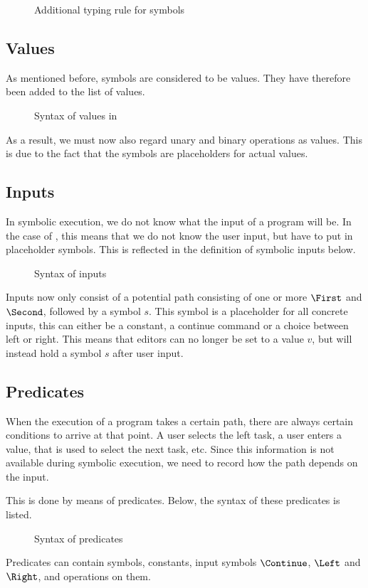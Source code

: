 \begin{figure}
\caption{Additional typing rule for symbols}
  \label{fig:typingsymbol}
\end{figure}

\subsection{Values}

As mentioned before, symbols are considered to be values.
They have therefore been added to the list of values.

\begin{figure}
\caption{Syntax of values in \TOPHAT}
  \label{fig:syntaxvalues}
\end{figure}

As a result, we must now also regard unary and binary operations as values.
This is due to the fact that the symbols are placeholders for actual values.


\subsection{Inputs}

In symbolic execution, we do not know what the input of a program will be.
In the case of \TOPHAT, this means that we do not know the user input, but have to put in placeholder symbols.
This is reflected in the definition of symbolic inputs below.

\begin{figure}
\caption{Syntax of inputs}
  \label{fig:syntaxinputs}
\end{figure}

Inputs now only consist of a potential path consisting of one or more $\First$ and $\Second$,
followed by a symbol $s$.
This symbol is a placeholder for all concrete inputs, this can either be a constant, a continue command or a choice between left or right.
This means that editors can no longer be set to a value $v$, but will instead hold a symbol $s$ after user input.


\subsection{Predicates}

When the execution of a \TOPHAT program takes a certain path, there are always certain conditions to arrive at that point.
A user selects the left task, a user enters a value, that is used to select the next task, etc.
Since this information is not available during symbolic execution, we need to record how the path depends on the input.

This is done by means of predicates.
Below, the syntax of these predicates is listed.

\begin{figure}
\caption{Syntax of predicates}
  \label{fig:syntaxpredicates}
\end{figure}

Predicates can contain symbols, constants, input symbols $\Continue$, $\Left$ and $\Right$, and operations on them.
